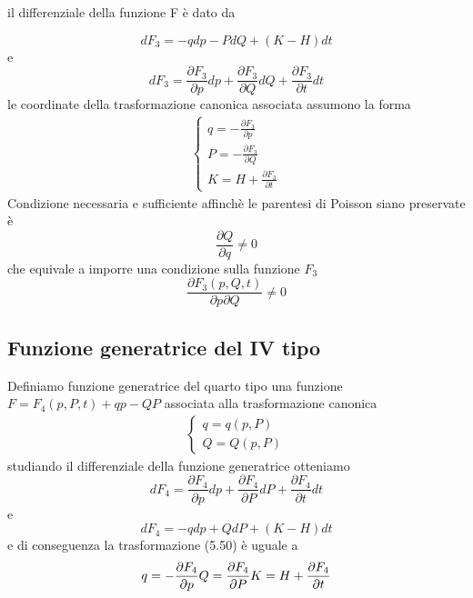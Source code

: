 il differenziale della funzione F \`{e} dato da

\begin{equation}
	dF_3 = -q d p-P d Q+(K-H) d t
\end{equation}	
e 
\begin{equation}
	dF_3 = \frac{\partial F_3}{\partial p} d p+\frac{\partial F_3}{\partial Q}dQ +\frac{\partial F_3}{\partial t} d t
\end{equation}
le coordinate della trasformazione canonica associata assumono la forma 
\begin{align}
	\begin{cases}
		q = - \frac{\partial F_3}{\partial p}\\
		P = - \frac{\partial F_3}{\partial Q}\\
		K = H + \frac{\partial F_3}{\partial t}
	\end{cases} 
\end{align}
Condizione necessaria e sufficiente affinch\`{e} le parentesi di Poisson siano preservate \`{e}
\begin{equation}
	\frac{\partial Q}{\partial q} \neq 0
\end{equation}
che equivale a imporre una condizione sulla funzione $F_3$ 
\begin{equation}
	\frac{\partial F_3(p,Q,t)}{\partial p \partial Q } \neq 0
\end{equation}

\subsection{Funzione generatrice del IV tipo}

Definiamo funzione generatrice del quarto tipo una funzione $F = F_4(p,P,t) + qp - QP $ associata alla trasformazione canonica
\begin{align}
	\begin{cases}
		q = q(p,P)\\
		Q = Q(p,P)
	\end{cases}
\end{align}
studiando il differenziale della funzione generatrice otteniamo 
\begin{equation}
	dF_4 = \frac{\partial F_4}{\partial p} d p+\frac{\partial F_4}{\partial P}dP +\frac{\partial F_4}{\partial t} d t
\end{equation}
e 
\begin{equation}
	dF_4 = -qdp + QdP + (K-H)dt  
\end{equation}
e di conseguenza la trasformazione (5.50) \`{e} uguale a  
\begin{equation}
	q = -\frac{\partial F_4}{\partial p}\\
	Q = \frac{\partial F_4}{\partial P}
	K = H + \frac{\partial F_4}{\partial t}
\end{equation}

